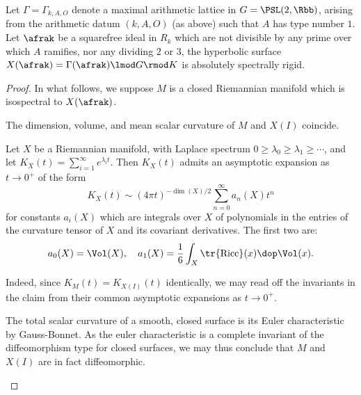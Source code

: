 \begin{thm}
	Let $\Gamma=\Gamma_{k,A,O}$ denote a maximal arithmetic lattice in $G=\PSL(2,\Rbb)$, arising from the arithmetic datum $(k,A,O)$ (as above) such that $A$ has type number $1$. Let $\afrak$ be a squarefree ideal in $R_k$ which are not divisible by any prime over which $A$ ramifies, nor any dividing $2$ or $3$, the hyperbolic surface $X(\afrak)=\Gamma(\afrak) \lmod G \rmod K$ is absolutely spectrally rigid.
\end{thm}
\begin{proof}
	In what follows, we suppose $M$ is a closed Riemannian manifold which is isospectral to $X(\afrak)$.

	\begin{claim}\label{claim:heat}
		The dimension, volume, and mean scalar curvature of $M$ and $X(I)$ coincide.
	\end{claim}



	\begin{lemma}
		Let $X$ be a Riemannian manifold, with Laplace spectrum $0\geq \lambda_0 \geq \lambda_1 \geq \cdots$, and let $K_X(t)=\sum_{i=1}^\infty e^{\lambda_i t}$. Then $K_X(t)$ admits an asymptotic expansion as $t\to 0^+$ of the form
		\[ K_X(t) \sim (4\pi t)^{-\dim(X)/2} \sum_{n=0}^\infty a_n(X) t^n \]
		for constants $a_i(X)$ which are integrals over $X$ of polynomials in the entries of the curvature tensor of $X$ and its covariant derivatives. The first two are:
		\[a_0(X) = \Vol(X),\quad a_1(X) = \frac{1}{6} \int_X \tr {\rm Ricc} (x) \dop \Vol(x).\]
	\end{lemma}

	Indeed, since $K_M(t) = K_{X(I)}(t)$ identically, we may read off the invariants in the claim from their common asymptotic expansions as $t\to 0^+$.
	\begin{rem}
		The total scalar curvature of a smooth, closed surface is its Euler characteristic by Gauss-Bonnet. As the euler characteristic is a complete invariant of the diffeomorphism type for closed surfaces, we may thus conclude that $M$ and $X(I)$ are in fact diffeomorphic.
	\end{rem}


\end{proof}
